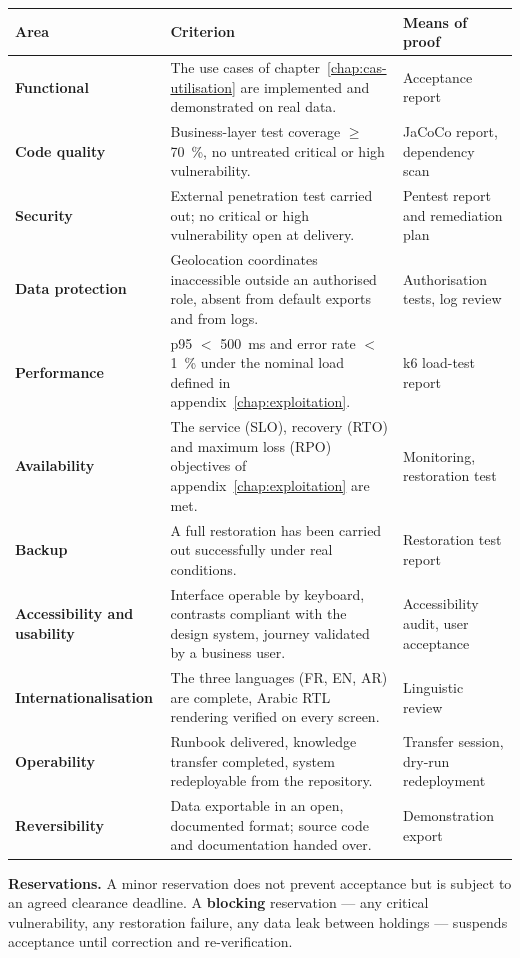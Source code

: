 \begin{xltabular}{\textwidth}{>{\bfseries}p{3.2cm} X p{3.4cm}}
\toprule
\textbf{Area} & \textbf{Criterion} & \textbf{Means of proof} \\
\midrule
\endhead
Functional & The use cases of chapter~\ref{chap:cas-utilisation} are implemented and demonstrated on real data. & Acceptance report \\
\addlinespace
Code quality & Business-layer test coverage $\geq$ 70~\%, no untreated critical or high vulnerability. & JaCoCo report, dependency scan \\
\addlinespace
Security & External penetration test carried out; no critical or high vulnerability open at delivery. & Pentest report and remediation plan \\
\addlinespace
Data protection & Geolocation coordinates inaccessible outside an authorised role, absent from default exports and from logs. & Authorisation tests, log review \\
\addlinespace
Performance & p95 $<$ 500~ms and error rate $<$ 1~\% under the nominal load defined in appendix~\ref{chap:exploitation}. & k6 load-test report \\
\addlinespace
Availability & The service (SLO), recovery (RTO) and maximum loss (RPO) objectives of appendix~\ref{chap:exploitation} are met. & Monitoring, restoration test \\
\addlinespace
Backup & A full restoration has been carried out successfully under real conditions. & Restoration test report \\
\addlinespace
Accessibility and usability & Interface operable by keyboard, contrasts compliant with the design system, journey validated by a business user. & Accessibility audit, user acceptance \\
\addlinespace
Internationalisation & The three languages (FR, EN, AR) are complete, Arabic RTL rendering verified on every screen. & Linguistic review \\
\addlinespace
Operability & Runbook delivered, knowledge transfer completed, system redeployable from the repository. & Transfer session, dry-run redeployment \\
\addlinespace
Reversibility & Data exportable in an open, documented format; source code and documentation handed over. & Demonstration export \\
\bottomrule
\end{xltabular}

\begin{encadre}
\textbf{Reservations.} A minor reservation does not prevent acceptance but is
subject to an agreed clearance deadline. A \textbf{blocking} reservation ---
any critical vulnerability, any restoration failure, any data leak between
holdings --- suspends acceptance until correction and re-verification.
\end{encadre}

